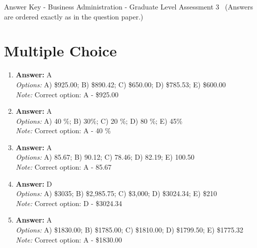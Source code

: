 \documentclass[12pt]{article}
\begin{document}
\begin{center}
Answer Key - Business Administration - Graduate Level Assessment 3 \
\small (Answers are ordered exactly as in the question paper.)
\end{center}

\section*{Multiple Choice}
\begin{enumerate}[label=\arabic*.]
\item \textbf{Answer:} A
\\ \textit{Options:} A) \$925.00; B) \$890.42; C) \$650.00; D) \$785.53; E) \$600.00
\\ \textit{Note:} Correct option: A - \$925.00
\item \textbf{Answer:} A
\\ \textit{Options:} A) 40 \%; B) 30\%; C) 20 \%; D) 80 \%; E) 45\%
\\ \textit{Note:} Correct option: A - 40 \%
\item \textbf{Answer:} A
\\ \textit{Options:} A) 85.67; B) 90.12; C) 78.46; D) 82.19; E) 100.50
\\ \textit{Note:} Correct option: A - 85.67
\item \textbf{Answer:} D
\\ \textit{Options:} A) \$3035; B) \$2,985.75; C) \$3,000; D) \$3024.34; E) \$210
\\ \textit{Note:} Correct option: D - \$3024.34
\item \textbf{Answer:} A
\\ \textit{Options:} A) \$1830.00; B) \$1785.00; C) \$1810.00; D) \$1799.50; E) \$1775.32
\\ \textit{Note:} Correct option: A - \$1830.00
\end{enumerate}
\end{document}
